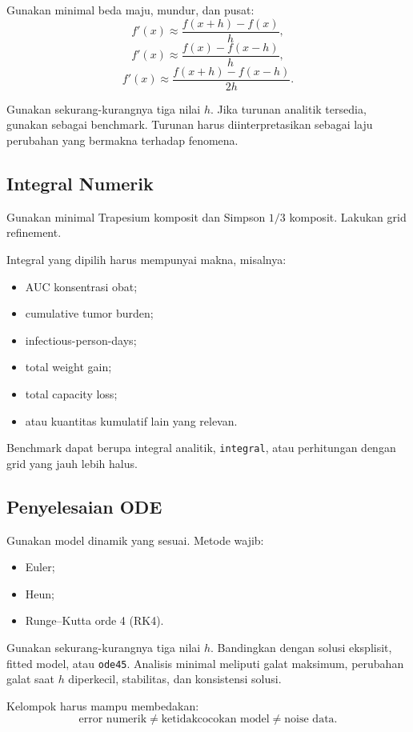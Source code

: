 \documentclass[11pt,a4paper]{article}
\begin{document}
Gunakan minimal beda maju, mundur, dan pusat:
\[
f'(x)\approx\frac{f(x+h)-f(x)}{h},
\]
\[
f'(x)\approx\frac{f(x)-f(x-h)}{h},
\]
\[
f'(x)\approx\frac{f(x+h)-f(x-h)}{2h}.
\]

Gunakan sekurang-kurangnya tiga nilai $h$. Jika turunan analitik tersedia, gunakan sebagai benchmark. Turunan harus diinterpretasikan sebagai laju perubahan yang bermakna terhadap fenomena.

\subsection{Integral Numerik}

Gunakan minimal Trapesium komposit dan Simpson $1/3$ komposit. Lakukan grid refinement.

Integral yang dipilih harus mempunyai makna, misalnya:
\begin{itemize}
    \item AUC konsentrasi obat;
    \item cumulative tumor burden;
    \item infectious-person-days;
    \item total weight gain;
    \item total capacity loss;
    \item atau kuantitas kumulatif lain yang relevan.
\end{itemize}

Benchmark dapat berupa integral analitik, \texttt{integral}, atau perhitungan dengan grid yang jauh lebih halus.

\subsection{Penyelesaian ODE}

Gunakan model dinamik yang sesuai. Metode wajib:
\begin{itemize}
    \item Euler;
    \item Heun;
    \item Runge--Kutta orde 4 (RK4).
\end{itemize}

Gunakan sekurang-kurangnya tiga nilai $h$. Bandingkan dengan solusi eksplisit, fitted model, atau \texttt{ode45}. Analisis minimal meliputi galat maksimum, perubahan galat saat $h$ diperkecil, stabilitas, dan konsistensi solusi.

Kelompok harus mampu membedakan:
\[
\boxed{\text{error numerik} \neq \text{ketidakcocokan model} \neq \text{noise data}.}
\]
\end{document}
